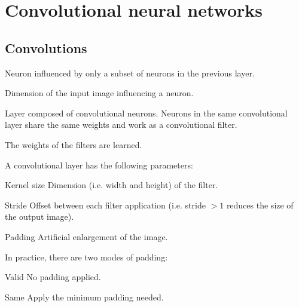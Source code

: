 \chapter{Convolutional neural networks}


\section{Convolutions}

\begin{description}
    \item[Convolution neuron] 
        Neuron influenced by only a subset of neurons in the previous layer.
        
    \item[Receptive field] 
        Dimension of the input image influencing a neuron.

    \item[Convolutional layer] 
        Layer composed of convolutional neurons.
        Neurons in the same convolutional layer share the same weights and work as a convolutional filter.

        \begin{remark}
            The weights of the filters are learned.
        \end{remark}

        A convolutional layer has the following parameters:
        \begin{descriptionlist}
            \item[Kernel size] 
                Dimension (i.e. width and height) of the filter.

            \item[Stride] 
                Offset between each filter application (i.e. stride $>1$ reduces the size of the output image).

            \item[Padding] 
                Artificial enlargement of the image.
                
                In practice, there are two modes of padding:
                \begin{descriptionlist}
                    \item[Valid] No padding applied.
                    \item[Same] Apply the minimum padding needed.
                \end{descriptionlist}


\end{descriptionlist}
\end{description}
